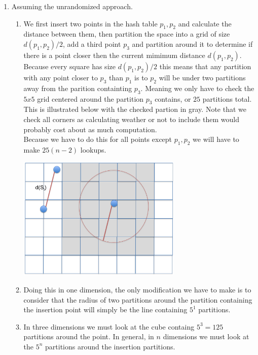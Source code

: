 \documentclass[11pt]{article}
\begin{document}
\begin{enumerate}
\begin{enumerate}
		\end{enumerate}
	\item Assuming the unrandomized approach.
		\begin{enumerate}
		\item We first insert two points in the hash table $p_1,p_2$ and calculate
			the distance between them, then partition the space
				into a grid of size $d(p_1,p_2)/2$, add a third point $p_3$ and
			partition around it to determine if there is a point
				closer then the current mimimum distance
				$d(p_1,p_2)$. Because every square has
				size $d(p_1,p_2)/2$ this means that any partition
				with any point closer to $p_3$ than $p_1$ is
				to $p_2$ will be under two partitions away from
				the parition containting 
				$p_3$. Meaning we only have to check the $5x5$
				grid centered around the partition $p_3$ contains,
				or $25$ partitions  total. 
				This is illustrated below with the checked partion in
				gray. Note that we check all corners as
				calculating weather or not to include them would
				probably cost about as much computation.\\
				Because we have to do this for all points except
				$p_1,p_2$ we will have to make $25(n-2)$
				lookups.
				
		\begin{center}
		\includegraphics[width=0.65\textwidth]{images/fig4}
		\end{center}
		\item Doing this in one dimension, the only modification we have to
			make is to consider that the radius of two partitions around the
			partition containing the insertion point will simply be the
				line containing $5^1$ partitions.
		\item In three dimensions we must look at the cube containg $5^3
			= 125$ partitions around the point. In general, in $n$
				dimensions we must look at the $5^n$ partitions
				around the insertion partitions.
		\end{enumerate}
\end{enumerate}
\end{document}
